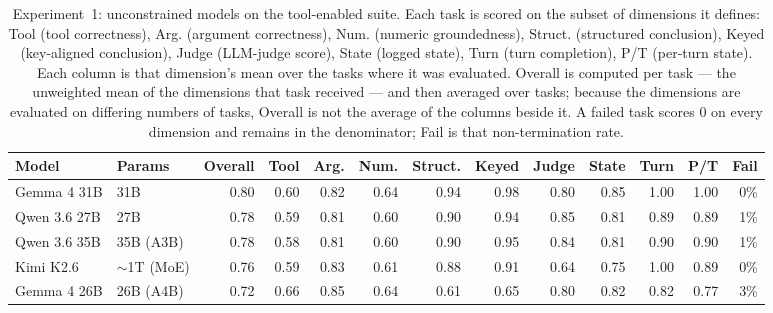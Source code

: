 \begin{table}[!t]
\centering
\caption{Experiment~1: unconstrained models on the tool-enabled suite. Each task is scored on the subset of dimensions it defines: Tool (tool correctness), Arg. (argument correctness), Num. (numeric groundedness), Struct. (structured conclusion), Keyed (key-aligned conclusion), Judge (LLM-judge score), State (logged state), Turn (turn completion), P/T (per-turn state). Each column is that dimension's mean over the tasks where it was evaluated. Overall is computed per task --- the unweighted mean of the dimensions that task received --- and then averaged over tasks; because the dimensions are evaluated on differing numbers of tasks, Overall is not the average of the columns beside it. A failed task scores 0 on every dimension and remains in the denominator; Fail is that non-termination rate.}
\label{tab:exp1}
\small
\setlength{\tabcolsep}{4pt}
\begin{tabular}{@{}ll rrrrrrrrrrr@{}}
\toprule
Model & Params & Overall & Tool & Arg. & Num. & Struct. & Keyed & Judge & State & Turn & P/T & Fail \\
\midrule
Gemma 4 31B & 31B & 0.80 & 0.60 & 0.82 & 0.64 & 0.94 & 0.98 & 0.80 & 0.85 & 1.00 & 1.00 & 0\% \\
Qwen 3.6 27B & 27B & 0.78 & 0.59 & 0.81 & 0.60 & 0.90 & 0.94 & 0.85 & 0.81 & 0.89 & 0.89 & 1\% \\
Qwen 3.6 35B & 35B (A3B) & 0.78 & 0.58 & 0.81 & 0.60 & 0.90 & 0.95 & 0.84 & 0.81 & 0.90 & 0.90 & 1\% \\
Kimi K2.6 & $\sim$1T (MoE) & 0.76 & 0.59 & 0.83 & 0.61 & 0.88 & 0.91 & 0.64 & 0.75 & 1.00 & 0.89 & 0\% \\
Gemma 4 26B & 26B (A4B) & 0.72 & 0.66 & 0.85 & 0.64 & 0.61 & 0.65 & 0.80 & 0.82 & 0.82 & 0.77 & 3\% \\
\bottomrule
\end{tabular}
\end{table}
